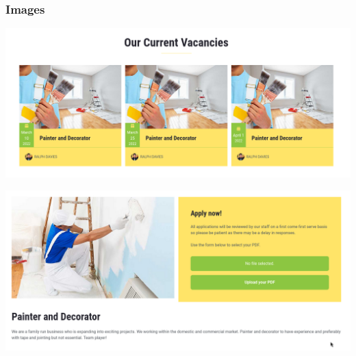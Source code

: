 \documentclass[a4paper]{article}
\begin{document}
    
          \subsubsection{Images}
      
              \begin{minipage}[c]{\textwidth}
          \centering
          \includegraphics[width=\textwidth]{src/issues/5 - PREMONITION/issue51.png}
          \label{5:PREMONITION:issue.md:issue51.png}
          \vspace{4ex}
        \end{minipage}
              \begin{minipage}[c]{\textwidth}
          \centering
          \includegraphics[width=\textwidth]{src/issues/5 - PREMONITION/issue52.png}
          \label{5:PREMONITION:issue.md:issue52.png}
          \vspace{4ex}
        \end{minipage}
\end{document}
